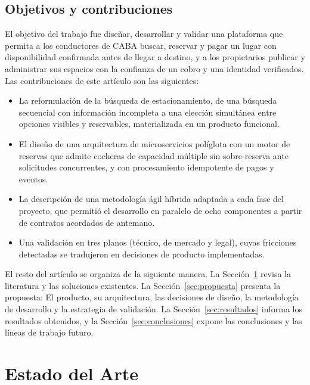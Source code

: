 \documentclass[conference,a4paper]{IEEEtran}
\begin{document}
\subsection{Objetivos y contribuciones}

El objetivo del trabajo fue diseñar, desarrollar y validar una plataforma que permita a los conductores de CABA buscar, reservar y pagar un lugar con disponibilidad confirmada antes de llegar a destino, y a los propietarios publicar y administrar sus espacios con la confianza de un cobro y una identidad verificados. Las contribuciones de este artículo son las siguientes:

\begin{itemize}
    \item La reformulación de la búsqueda de estacionamiento, de una búsqueda secuencial con información incompleta a una elección simultánea entre opciones visibles y reservables, materializada en un producto funcional.
    \item El diseño de una arquitectura de microservicios políglota con un motor de reservas que admite cocheras de capacidad múltiple sin sobre-reserva ante solicitudes concurrentes, y con procesamiento idempotente de pagos y eventos.
    \item La descripción de una metodología ágil híbrida adaptada a cada fase del proyecto, que permitió el desarrollo en paralelo de ocho componentes a partir de contratos acordados de antemano.
    \item Una validación en tres planos (técnico, de mercado y legal), cuyas fricciones detectadas se tradujeron en decisiones de producto implementadas.
\end{itemize}

El resto del artículo se organiza de la siguiente manera. La Sección~\ref{sec:estado} revisa la literatura y las soluciones existentes. La Sección~\ref{sec:propuesta} presenta la propuesta: El producto, su arquitectura, las decisiones de diseño, la metodología de desarrollo y la estrategia de validación. La Sección~\ref{sec:resultados} informa los resultados obtenidos, y la Sección~\ref{sec:conclusiones} expone las conclusiones y las líneas de trabajo futuro.

\section{Estado del Arte}\label{sec:estado}
\end{document}
